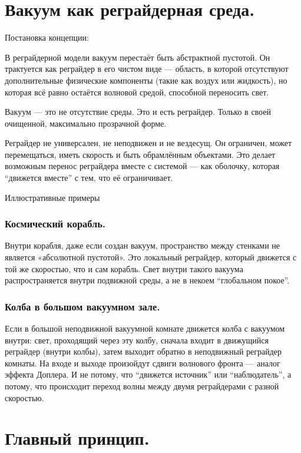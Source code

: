 \documentclass[12pt]{article}
\begin{document}
\section*{Вакуум как реграйдерная среда.}

Постановка концепции:

В реграйдерной модели вакуум перестаёт быть абстрактной пустотой. Он трактуется как реграйдер в его чистом виде — область, в которой отсутствуют дополнительные физические компоненты (такие как воздух или жидкость), но которая всё равно остаётся волновой средой, способной переносить свет.

Вакуум — это не отсутствие среды. Это и есть реграйдер. Только в своей очищенной, максимально прозрачной форме.

Реграйдер не универсален, не неподвижен и не вездесущ. Он ограничен, может перемещаться, иметь скорость и быть обрамлённым объектами. Это делает возможным перенос реграйдера вместе с системой — как оболочку, которая “движется вместе” с тем, что её ограничивает.

Иллюстративные примеры

\subsubsection*{Космический корабль.}
Внутри корабля, даже если создан вакуум, пространство между стенками не является «абсолютной пустотой». Это локальный реграйдер, который движется с той же скоростью, что и сам корабль. Свет внутри такого вакуума распространяется внутри подвижной среды, а не в некоем “глобальном покое”.

\subsubsection*{Колба в большом вакуумном зале.}
Если в большой неподвижной вакуумной комнате движется колба с вакуумом внутри:
свет, проходящий через эту колбу, сначала входит в движущийся реграйдер (внутри колбы),
затем выходит обратно в неподвижный реграйдер комнаты.
На входе и выходе произойдут сдвиги волнового фронта — аналог эффекта Доплера. И не потому, что “движется источник” или “наблюдатель”, а потому, что происходит переход волны между двумя реграйдерами с разной скоростью.

\section*{Главный принцип.}
\end{document}

